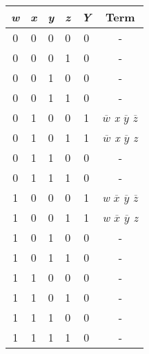 \begin{tabular}{|c|c|c|c|c|c|}
\hline
\textit{\textbf{w}} & \textit{\textbf{x}} & \textit{\textbf{y}} & \textit{\textbf{z}} & \textit{\textbf{Y}} & \textbf{Term}    \\ \hline
0                   & 0                   & 0                   & 0                   & 0                   & -                \\
0                   & 0                   & 0                   & 1                   & 0                   & -                \\
0                   & 0                   & 1                   & 0                   & 0                   & -                \\
0                   & 0                   & 1                   & 1                   & 0                   & -                \\
0                   & 1                   & 0                   & 0                   & 1                   & \textit{$\overline{w}$ x $\overline{y}$  $\overline{z}$} \\
0                   & 1                   & 0                   & 1                   & 1                   & \textit{$\overline{w}$ x $\overline{y}$ z}  \\
0                   & 1                   & 1                   & 0                   & 0                   & -                \\
0                   & 1                   & 1                   & 1                   & 0                   & -                \\
1                   & 0                   & 0                   & 0                   & 1                   & \textit{w $\overline{x}$ $\overline{y}$ $\overline{z}$} \\
1                   & 0                   & 0                   & 1                   & 1                   & \textit{w $\overline{x}$ $\overline{y}$ z}  \\
1                   & 0                   & 1                   & 0                   & 0                   & -                \\
1                   & 0                   & 1                   & 1                   & 0                   & -                \\
1                   & 1                   & 0                   & 0                   & 0                   & -                \\
1                   & 1                   & 0                   & 1                   & 0                   & -                \\
1                   & 1                   & 1                   & 0                   & 0                   & -                \\
1                   & 1                   & 1                   & 1                   & 0                   & -                \\ \hline
\end{tabular}